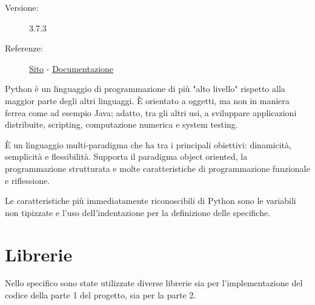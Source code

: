 \documentclass[preprint,12pt]{elsarticle}
\begin{document}
\medskip
\begin{description}
\item[Versione:] 3.7.3
\item[Referenze:] \href{https://www.python.org}{Sito} - \href{https://docs.python.org/3/}{Documentazione}
\end{description}

Python è un linguaggio di programmazione di più "alto livello" rispetto alla maggior parte degli altri linguaggi. È orientato a oggetti, ma non in maniera ferrea come ad esempio Java; adatto, tra gli altri usi, a sviluppare applicazioni distribuite, scripting, computazione numerica e system testing.

È un linguaggio multi-paradigma che ha tra i principali obiettivi: dinamicità, semplicità e flessibilità. Supporta il paradigma object oriented, la programmazione strutturata e molte caratteristiche di programmazione funzionale e riflessione.

Le caratteristiche più immediatamente riconoscibili di Python sono le variabili non tipizzate e l'uso dell'indentazione per la definizione delle specifiche. \\

\section{Librerie}
Nello specifico sono state utilizzate diverse librerie sia per l'implementazione del codice della parte 1 del progetto, sia per la parte 2.
\end{document}

